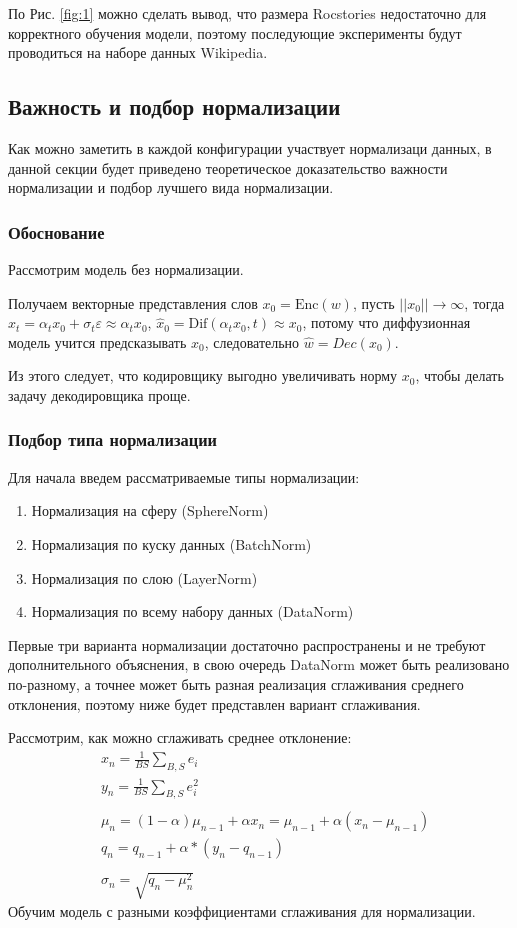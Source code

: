 \documentclass[12pt,a4paper]{article}
\begin{document}
По Рис. \ref{fig:1} можно сделать вывод, что размера Rocstories недостаточно для корректного обучения модели, поэтому последующие эксперименты будут проводиться на наборе данных Wikipedia.
\subsection{Важность и подбор нормализации}
Как можно заметить в каждой конфигурации участвует нормализаци данных, в данной секции будет приведено теоретическое доказательство важности нормализации и подбор лучшего вида нормализации.
\subsubsection{Обоснование}
Рассмотрим модель без нормализации.

Получаем векторные представления слов $x_0 = \text{Enc}(w)$, пусть $||x_0|| \rightarrow \infty$, тогда $x_t = \alpha_t x_0 + \sigma_t \varepsilon \approx \alpha_t x_0$, $\hat{x}_0 = \text{Dif}(\alpha_t x_0, t) \approx x_0$, потому что диффузионная модель учится предсказывать $x_0$, следовательно  $\hat{w} = Dec(x_0)$.

Из этого следует, что кодировщику выгодно увеличивать норму $x_0$, чтобы делать задачу декодировщика проще.
\subsubsection{Подбор типа нормализации}
Для начала введем рассматриваемые типы нормализации:
\begin{enumerate}
    \item Нормализация на сферу (SphereNorm)
    \item Нормализация по куску данных (BatchNorm)
    \item Нормализация по слою (LayerNorm)
    \item Нормализация по всему набору данных (DataNorm)
\end{enumerate}

Первые три варианта нормализации достаточно распространены и не требуют дополнительного объяснения, в свою очередь DataNorm может быть реализовано по-разному, а точнее может быть разная реализация сглаживания среднего отклонения, поэтому ниже будет представлен вариант сглаживания.

Рассмотрим, как можно сглаживать среднее отклонение:
\begin{align} 
& x_n = \frac{1}{BS} \sum_{B, S} e_i \\ 
& y_n = \frac{1}{BS} \sum_{B, S} e_i^2\\\\
& \mu_n = (1 - \alpha) \mu_{n-1} + \alpha x_n = \mu_{n-1} + \alpha (x_n - \mu_{n-1}) \\
& q_n = q_{n-1} + \alpha * (y_n - q_{n-1}) \\\\
& \sigma_n = \sqrt{q_n - \mu_n^2}
\end{align} 
Обучим модель с разными коэффициентами сглаживания для нормализации.
\end{document}
